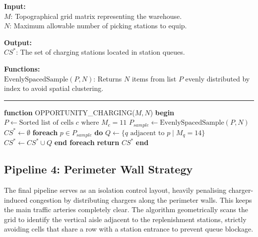 \documentclass[conference]{IEEEtran}
\newcommand{\alginput}[1]{\vspace{0.2cm}\noindent\textbf{Input:}\\ \indent #1}
\newcommand{\algoutput}[1]{\vspace{0.2cm}\noindent\textbf{Output:}\\ \indent #1}
\newcommand{\algfunc}[1]{\vspace{0.2cm}\noindent\textbf{Functions:}\\ \indent #1}
\begin{document}
\begin{algorithm}[htbp]
\caption{OPPORTUNITY\_CHARGING: Picking Station Layout}
\label{alg:picking}
\alginput{
$M$: Topographical grid matrix representing the warehouse.\\
$N$: Maximum allowable number of picking stations to equip.
}
\algoutput{
$CS^*$: The set of charging stations located in station queues.
}
\algfunc{
$\text{EvenlySpacedSample}(P, N)$: Returns $N$ items from list $P$ evenly distributed by index to avoid spatial clustering.
}
\vspace{0.2cm}
\hrule
\vspace{0.2cm}
\begin{algorithmic}[1]
\STATE \textbf{function} OPPORTUNITY\_CHARGING($M, N$)
\STATE \textbf{begin}
\STATE \quad $P \leftarrow \text{Sorted list of cells } c \text{ where } M_c = 11$
\STATE \quad $P_{sample} \leftarrow \text{EvenlySpacedSample}(P, N)$
\STATE \quad $CS^* \leftarrow \emptyset$
\STATE \quad \textbf{foreach} $p \in P_{sample}$ \textbf{do}
\STATE \quad \quad $Q \leftarrow \{ q \text{ adjacent to } p \mid M_q = 14 \}$
\STATE \quad \quad $CS^* \leftarrow CS^* \cup Q$
\STATE \quad \textbf{end foreach}
\STATE \quad \textbf{return} $CS^*$
\STATE \textbf{end}
\end{algorithmic}
\end{algorithm}

\subsection{Pipeline 4: Perimeter Wall Strategy}
The final pipeline serves as an isolation control layout, heavily penalising charger-induced congestion by distributing chargers along the perimeter walls. This keeps the main traffic arteries completely clear. The algorithm geometrically scans the grid to identify the vertical aisle adjacent to the replenishment stations, strictly avoiding cells that share a row with a station entrance to prevent queue blockage.
\end{document}
